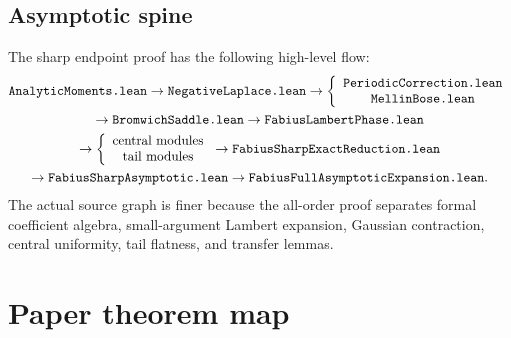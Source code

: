 \documentclass[11pt,oneside]{article}
\theoremstyle{definition}
\theoremstyle{remark}
\begin{document}
\subsection{Asymptotic spine}
The sharp endpoint proof has the following high-level flow:
\[
\begin{gathered}
\text{\texttt{AnalyticMoments.lean}}
\to\text{\texttt{NegativeLaplace.lean}}
\to\left\{
\begin{array}{c}
\text{\texttt{PeriodicCorrection.lean}}\\
\text{\texttt{MellinBose.lean}}
\end{array}
\right.\\
\to\text{\texttt{BromwichSaddle.lean}}
\to\text{\texttt{FabiusLambertPhase.lean}}\\
\to\left\{
\begin{array}{c}
\text{central modules}\\
\text{tail modules}
\end{array}
\right.
\to\text{\texttt{FabiusSharpExactReduction.lean}}\\
\to\text{\texttt{FabiusSharpAsymptotic.lean}}
\to\text{\texttt{FabiusFullAsymptoticExpansion.lean}}.
\end{gathered}
\]
The actual source graph is finer because the all-order proof separates formal coefficient algebra, small-argument Lambert expansion, Gaussian contraction, central uniformity, tail flatness, and transfer lemmas.

\section{Paper theorem map}\label{app:paper-map}
\end{document}
